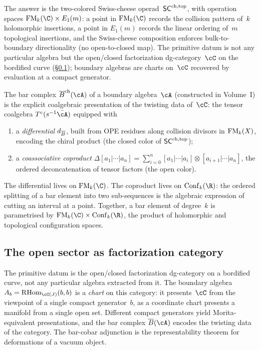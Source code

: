 The answer is the two-colored Swiss-cheese operad~$\mathsf{SC}^{\mathrm{ch},\mathrm{top}}$, with
operation spaces $\FM_k(\C) \times E_1(m)$: a point in
$\FM_k(\C)$ records the collision pattern of~$k$ holomorphic
insertions, a point in $E_1(m)$ records the linear ordering
of~$m$ topological insertions, and the Swiss-cheese composition
enforces bulk-to-boundary directionality (no open-to-closed map).
The primitive datum is not any particular algebra but the
open/closed factorization dg-category~$\cC$ on the bordified curve
(\S\ref{subsec:categorical-open-sector}); boundary algebras are
charts on~$\cC$ recovered by evaluation at a compact generator.

The bar complex $\barB^{\mathrm{ch}}(\cA)$ of a boundary
algebra~$\cA$ (constructed in Volume~I) is the explicit
coalgebraic presentation of the twisting data of~$\cC$: the
tensor coalgebra $T^c(s^{-1}\bar{\cA})$ equipped with
\begin{enumerate}[label=(\roman*)]
\item a \emph{differential} $d_{\overline{B}}$, built from OPE
 residues along collision divisors in $\mathrm{FM}_k(X)$, encoding the
 chiral product (the closed color of $\mathsf{SC}^{\mathrm{ch},\mathrm{top}}$);
\item a \emph{coassociative coproduct}
 $\Delta[a_1|\cdots|a_n]
 = \sum_{i=0}^{n} [a_1|\cdots|a_i]
 \otimes [a_{i+1}|\cdots|a_n]$,
 the ordered deconcatenation of tensor factors (the open color).
\end{enumerate}
The differential lives on $\FM_k(\C)$. The coproduct lives on
$\Conf_k(\R)$: the ordered splitting of a bar element into two
sub-sequences is the algebraic expression of cutting an interval at
a point. Together, a bar element of degree~$k$ is parametrised by
$\FM_k(\C) \times \Conf_k(\R)$, the product of holomorphic and
topological configuration spaces.

\subsection{The open sector as factorization category}
\label{subsec:categorical-open-sector}

The primitive datum is the open/closed factorization dg-category on
a bordified curve, not any particular algebra
extracted from it. The boundary
algebra $A_b = \RHom_{\cC(J)}(b,b)$ is a \emph{chart} on this
category: it presents~$\cC$ from the viewpoint of a single compact
generator~$b$, as a coordinate chart presents a manifold from
a single open set. Different compact generators yield
Morita-equivalent presentations, and the bar complex
$\barB(\cA)$ encodes the twisting data of the category. The
bar-cobar adjunction is the representability theorem for
deformations of a vacuum object.

